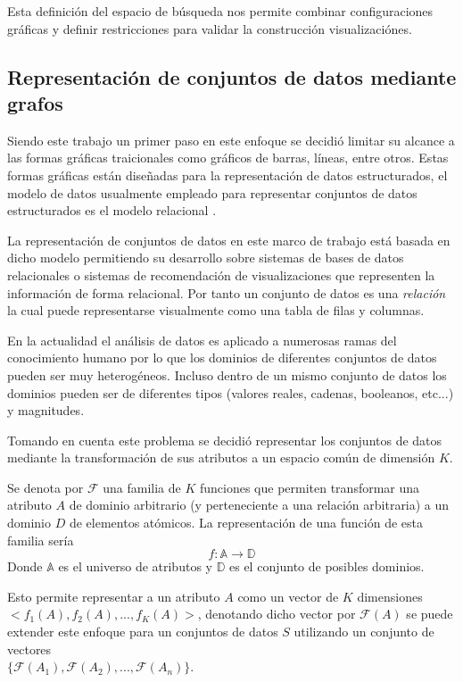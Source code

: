 Esta definici\'on del espacio de b\'usqueda nos permite combinar configuraciones gr\'aficas y definir restricciones para
validar la construcci\'on visualizaci\'ones.

\subsection{Representaci\'on de conjuntos de datos mediante grafos}

Siendo este trabajo un primer paso en este enfoque se decidi\'o limitar su alcance
a las formas gr\'aficas traicionales como gr\'aficos de barras, l\'ineas, entre otros. Estas formas
gr\'aficas est\'an dise\~nadas para la representaci\'on de datos estructurados, el modelo de 
datos usualmente empleado para representar conjuntos de datos estructurados es el modelo relacional \cite{codd1970relational}.

La representaci\'on de conjuntos de datos en este marco de trabajo est\'a basada en dicho modelo permitiendo su
desarrollo sobre sistemas de bases de datos relacionales o sistemas de recomendaci\'on de visualizaciones que representen
la informaci\'on de forma relacional. Por tanto un conjunto de datos es una \textit{relaci\'on} la cual puede representarse visualmente
como una tabla de filas y columnas.

En la actualidad el an\'alisis de datos es aplicado a numerosas
ramas del conocimiento humano por lo
que los dominios de diferentes conjuntos de datos pueden ser muy heterog\'eneos.
Incluso dentro de un mismo conjunto de datos los dominios pueden ser de
diferentes tipos (valores reales, cadenas, booleanos, etc...) y magnitudes.

Tomando en cuenta este problema se decidi\'o representar los conjuntos de datos
mediante la transformaci\'on de sus atributos a un espacio com\'un de dimensi\'on $K$.

\begin{definition}
    Se denota por $\mathcal{F}$ una familia de $K$ funciones que permiten transformar
    una atributo $A$ de dominio arbitrario (y perteneciente a una relaci\'on
    arbitraria) a un dominio $D$ de elementos at\'omicos.
    La representaci\'on de una funci\'on de esta familia ser\'ia
    $$
        f : \mathbb{A} \to \mathbb{D}
    $$
    Donde $\mathbb{A}$ es el universo de atributos y $\mathbb{D}$ es el conjunto de posibles dominios.
\end{definition}

Esto permite representar a un atributo $A$ como un vector de $K$ dimensiones \\$ <f_1(A), f_2(A), ..., f_K(A)>$, denotando dicho vector
por $\mathcal{F}(A)$ se puede extender este enfoque para un conjuntos de datos $S$ utilizando un conjunto de vectores \\
$\{ \mathcal{F}(A_1), \mathcal{F}(A_2), ..., \mathcal{F}(A_n)\}$.

